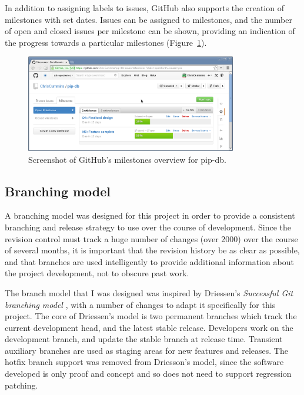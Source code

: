 In addition to assigning labels to issues, GitHub also supports the
creation of milestones with set dates. Issues can be assigned to
milestones, and the number of open and closed issues per milestone can
be shown, providing an indication of the progress towards a particular
milestones (Figure~\ref{fig:github-milestones}).


\begin{figure}[H]
\centering
    \includegraphics[width=0.82\textwidth]{assets/github-milestones}
\caption[Screenshot of open project milestones]
        {Screenshot of GitHub's milestones overview for pip-db.}
\label{fig:github-milestones}
\end{figure}


\subsection{Branching model}\label{subsec:branching-model}

A branching model was designed for this project in order to provide a
consistent branching and release strategy to use over the course of
development. Since the revision control must track a huge number of
changes (over 2000) over the course of several months, it is important
that the revision history be as clear as possible, and that branches
are used intelligently to provide additional information about the
project development, not to obscure past work.

The branch model that I was designed was inspired by Driessen's
\textit{Successful Git branching model} \cite{driessen2012successful},
with a number of changes to adapt it specifically for this
project. The core of Driessen's model is two permanent branches which
track the current development head, and the latest stable
release. Developers work on the development branch, and update the
stable branch at release time. Transient auxiliary branches are used
as staging areas for new features and releases. The hotfix branch
support was removed from Driesson's model, since the software
developed is only proof and concept and so does not need to support
regression patching.


